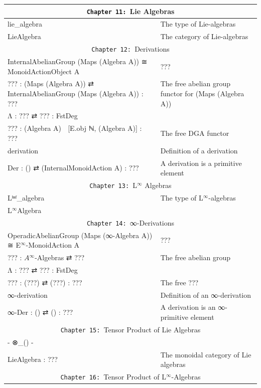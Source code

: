\documentclass{book}
\theoremstyle{definition}
\begin{document}
{\begin{longtable}{|| l || l ||}
\hline \hline
\multicolumn{2}{||c||}{\texttt{Chapter 11: }Lie Algebras} \\
\hline \hline
lie\_algebra & The type of Lie-algebras \\
\hline
LieAlgebra & The category of Lie-algebras \\
\hline \hline
\multicolumn{2}{||c||}{\texttt{Chapter 12: }Derivations} \\
\hline \hline
InternalAbelianGroup (Maps (Algebra A)) ≅ MonoidActionObject A & ??? \\
\hline
??? : (Maps (Algebra A)) ⇄ InternalAbelianGroup (Maps (Algebra A)) : ??? & The free abelian group functor for (Maps (Algebra A)) \\
\hline
Λ : ??? ⇄ ??? : FstDeg & \\ 
\hline
??? : (Algebra A) ⇄ [E⃗.obj ℕ, (Algebra A)] : ??? & The free DGA functor \\
\hline 
derivation & Definition of a derivation \\
\hline
Der : () ⇄ (InternalMonoidAction A) : ??? & A derivation is a primitive element \\
\hline \hline
\multicolumn{2}{||c||}{\texttt{Chapter 13: }L${}^{\infty}$ Algebras} \\
\hline \hline
Lⁱⁿᶠ\_algebra & The type of L${}^{\infty}$-algebras  \\
\hline
L${}^{\infty}$Algebra &  \\
\hline \hline
\multicolumn{2}{||c||}{\texttt{Chapter 14: }∞-Derivations} \\
\hline \hline
OperadicAbelianGroup (Maps (∞-Algebra A)) ≅ E${}^{\infty}$-MonoidAction A & ??? \\
\hline
??? : $A{}^{\infty}$-Algebras ⇄ ???  & The free abelian group \\
\hline
Λ : ??? ⇄ ??? : FstDeg &  \\ 
\hline
??? : (???) ⇄ (???) : ??? & The free ??? \\
\hline
∞-derivation & Definition of an ∞-derivation \\
\hline
∞-Der : () ⇄ () : ??? & A derivation is an ∞-primitive element \\
\hline \hline
\multicolumn{2}{||c||}{\texttt{Chapter 15: }Tensor Product of Lie Algebras} \\
\hline \hline
- ⊗\_() - &  \\
\hline
LieAlgebra : ??? & The monoidal category of Lie algebras\\
\hline \hline
\multicolumn{2}{||c||}{\texttt{Chapter 16: }Tensor Product of L${}^{\infty}$-Algebras} \\

\end{longtable}}
\end{document}
